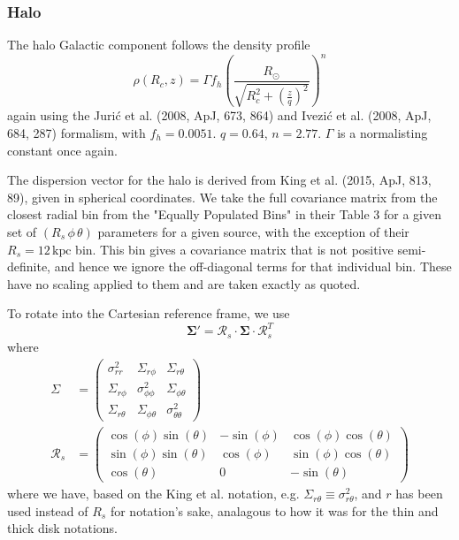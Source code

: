 \documentclass[fleqn,usenatbib]{mnras}
\begin{document}
\subsubsection{Halo}
The halo Galactic component follows the density profile
\begin{equation}
    \rho(R_c, z) = \Gamma f_h \left(\frac{R_\odot}{\sqrt{R_c^2 + \left(\frac{z}{q}\right)^2}}\right)^n
\end{equation}
again using the Juri\'{c} et al. (2008, ApJ, 673, 864) and Ivezi\'{c} et al. (2008, ApJ, 684, 287) formalism, with $f_h = 0.0051$. $q = 0.64$, $n = 2.77$. $\Gamma$ is a normalisting constant once again.

The dispersion vector for the halo is derived from King et al. (2015, ApJ, 813, 89), given in spherical coordinates. We take the full covariance matrix from the closest radial bin from the "Equally Populated Bins" in their Table 3 for a given set of $\left(R_s\,\phi\,\theta\right)$ parameters for a given source, with the exception of their $R_s = 12\,\mathrm{kpc}$ bin. This bin gives a covariance matrix that is not positive semi-definite, and hence we ignore the off-diagonal terms for that individual bin. These have no scaling applied to them and are taken exactly as quoted.

To rotate into the Cartesian reference frame, we use
\begin{equation}
    \bm{\Sigma}{'} = \bm{\mathcal{R}}_s \cdot \bm{\Sigma} \cdot \bm{\mathcal{R}}_s^T
\end{equation}
where
\begin{align}
    \Sigma &= \left(\begin{matrix} \sigma_{rr}^2 & \Sigma_{r\phi} & \Sigma_{r\theta} \\ \Sigma_{r\phi} & \sigma_{\phi\phi}^2 & \Sigma_{\phi\theta} \\ \Sigma_{r\theta} & \Sigma_{\phi\theta} & \sigma_{\theta\theta}^2 \end{matrix}\right) \\
    \bm{\mathcal{R}}_s &= \left(\begin{matrix} \cos(\phi)\sin(\theta) & -\sin(\phi) & \cos(\phi)\cos(\theta) \\ \sin(\phi)\sin(\theta) & \cos(\phi) & \sin(\phi)\cos(\theta) \\ \cos(\theta) & 0 & -\sin(\theta) \end{matrix}\right)
\end{align}
where we have, based on the King et al. notation, e.g. $\Sigma_{r\theta} \equiv \sigma_{r\theta}^2$, and $r$ has been used instead of $R_s$ for notation's sake, analagous to how it was for the thin and thick disk notations.
\end{document}
